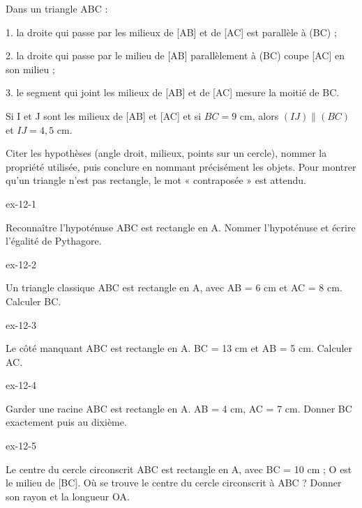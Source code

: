 \begin{propriete}Dans un triangle ABC :
\par 1. la droite qui passe par les milieux de [AB] et de [AC] est parallèle à (BC) ;
\par 2. la droite qui passe par le milieu de [AB] parallèlement à (BC) coupe [AC] en son milieu ;
\par 3. le segment qui joint les milieux de [AB] et de [AC] mesure la moitié de BC.\end{propriete}
\begin{exemple}Si I et J sont les milieux de [AB] et [AC] et si $BC=9$ cm, alors $(IJ)\parallel(BC)$ et $IJ=4{,}5$ cm.\end{exemple}
\begin{savoirfaire}[Rédiger]Citer les hypothèses (angle droit, milieux, points sur un cercle), nommer la propriété utilisée, puis conclure en nommant précisément les objets. Pour montrer qu’un triangle n’est pas rectangle, le mot « contraposée » est attendu.\end{savoirfaire}
\clearpage{}
\begin{blocLivre}{ex-12-1}\begin{exercice}[1]{Reconnaître l’hypoténuse}
ABC est rectangle en A. Nommer l’hypoténuse et écrire l’égalité de Pythagore.
\label{fig-ex-12-1}
\end{exercice}\end{blocLivre}
\begin{blocLivre}{ex-12-2}\begin{exercice}[1]{Un triangle classique}
ABC est rectangle en A, avec AB = 6 cm et AC = 8 cm. Calculer BC.
\label{fig-ex-12-2}
\end{exercice}\end{blocLivre}
\begin{blocLivre}{ex-12-3}\begin{exercice}[1]{Le côté manquant}
ABC est rectangle en A. BC = 13 cm et AB = 5 cm. Calculer AC.
\label{fig-ex-12-3}
\end{exercice}\end{blocLivre}
\begin{blocLivre}{ex-12-4}\begin{exercice}[1]{Garder une racine}
ABC est rectangle en A. AB = 4 cm, AC = 7 cm. Donner BC exactement puis au dixième.
\label{fig-ex-12-4}
\end{exercice}\end{blocLivre}
\begin{blocLivre}{ex-12-5}\begin{exercice}[1]{Le centre du cercle circonscrit}
ABC est rectangle en A, avec BC = 10 cm ; O est le milieu de [BC]. Où se trouve le centre du cercle circonscrit à ABC ? Donner son rayon et la longueur OA.
\label{fig-ex-12-5}
\end{exercice}\end{blocLivre}

